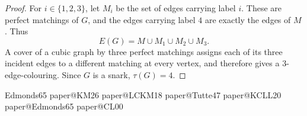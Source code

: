 \documentclass[justified,notoc,twoside,nobib,nofonts]{tufte-handout}
\makeatletter
\newcommand{\paperreference}[1]{\csname paper@#1\endcsname}
\newcommand{\three}{\{1,2,3\}}
\makeatother
\begin{document}
\begin{proof}
For $i\in\three$, let $M_i$ be the set of edges carrying label $i$.
These are perfect matchings of $G$, and the edges carrying label $4$
are exactly the edges of $M$. Thus
\[
  E(G)=M\cup M_1\cup M_2\cup M_3.
\]
A cover of a cubic graph by three perfect matchings assigns each of
its three incident edges to a different matching at every vertex,
and therefore gives a $3$-edge-colouring. Since $G$ is a snark,
$\tau(G)=4$.
\end{proof}

\clearpage
\begin{thebibliography}{Edmonds65}
\paperreference{KM26}
\paperreference{LCKM18}
\paperreference{Tutte47}
\paperreference{KCLL20}
\paperreference{Edmonds65}
\paperreference{CL00}
\end{thebibliography}
\end{document}
